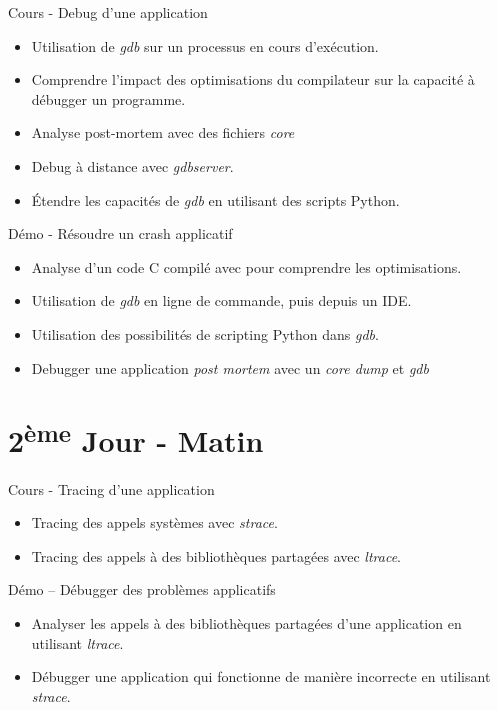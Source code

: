 \documentclass[a4paper,12pt,obeyspaces,spaces,hyphens]{article}
\begin{document}
\feagendatwocolumn
{Cours - Debug d'une application}
{
  \begin{itemize}
  \item Utilisation de {\em gdb} sur un processus en cours d'exécution.
  \item Comprendre l'impact des optimisations du compilateur sur la
    capacité à débugger un programme.
  \item Analyse post-mortem avec des fichiers {\em core}
  \item Debug à distance avec {\em gdbserver}.
  \item Étendre les capacités de {\em gdb} en utilisant des scripts
    Python.
  \end{itemize}
}
{Démo - Résoudre un crash applicatif}
{
  \begin{itemize}
  \item Analyse d'un code C compilé avec  pour
    comprendre les optimisations.
  \item Utilisation de {\em gdb} en ligne de commande, puis depuis un
    IDE.
  \item Utilisation des possibilités de scripting Python dans {\em gdb}.
  \item Debugger une application {\em post mortem} avec un {\em core
      dump} et {\em gdb}
  \end{itemize}
}

\section{2\textsuperscript{ème} Jour - Matin}

\feagendatwocolumn
{Cours - Tracing d'une application}
{
  \begin{itemize}
  \item Tracing des appels systèmes avec {\em strace}.
  \item Tracing des appels à des bibliothèques partagées avec {\em ltrace}.
  \end{itemize}
}
{Démo – Débugger des problèmes applicatifs}
{
  \begin{itemize}
  \item Analyser les appels à des bibliothèques partagées d'une
    application en utilisant {\em ltrace}.
  \item Débugger une application qui fonctionne de manière incorrecte
    en utilisant {\em strace}.
  \end{itemize}
}
\end{document}
